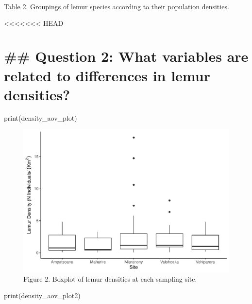 \documentclass[
  12pt,
]{article}
\newenvironment{Shaded}{\begin{snugshade}}{\end{snugshade}}
\newcommand{\FunctionTok}[1]{\textcolor[rgb]{0.00,0.00,0.00}{#1}}
\newcommand{\NormalTok}[1]{#1}
\begin{document}
Table 2. Groupings of lemur species according to their population
densities.

\textless\textless\textless\textless\textless\textless\textless{} HEAD

\hypertarget{question-2-what-variables-are-related-to-differences-in-lemur-densities-1}{%
\section{\#\# Question 2: What variables are related to differences in
lemur
densities?}\label{question-2-what-variables-are-related-to-differences-in-lemur-densities-1}}

\begin{Shaded}
\begin{Highlighting}[]
\FunctionTok{print}\NormalTok{(density\_aov\_plot)}
\end{Highlighting}
\end{Shaded}

\begin{figure}
\centering
\includegraphics{project_draft_files/figure-latex/unnamed-chunk-8-1.pdf}
\caption{Figure 2. Boxplot of lemur densities at each sampling site.}
\end{figure}

\begin{Shaded}
\begin{Highlighting}[]
\FunctionTok{print}\NormalTok{(density\_aov\_plot2)}
\end{Highlighting}
\end{Shaded}
\end{document}
